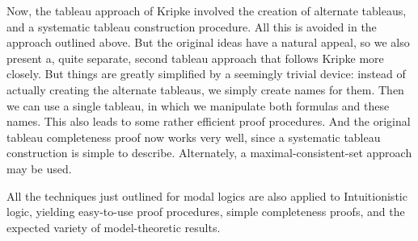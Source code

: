 Now, 
the tableau approach of Kripke involved the creation of alternate tableaus, 
and a systematic tableau construction procedure.
% 
All this is avoided in the approach outlined above.
% 
But the original ideas have a
natural appeal, 
so we also present a, 
quite separate,
second tableau approach that follows Kripke more closely.
% 
% 
But things are greatly simplified by a seemingly trivial device: 
instead of actually creating the alternate tableaus, 
we simply create names for them. 
% 
Then we can use a single tableau, 
in which we manipulate both formulas and these names. 
% 
This also leads to some rather efficient proof procedures.
% 
And the original tableau completeness proof now works very well, 
since a systematic tableau construction is simple to describe. 
% 
Alternately, a maximal-consistent-set approach may be used.




All the techniques just outlined for modal logics are also applied to Intuitionistic logic, 
yielding easy-to-use proof procedures, 
simple completeness proofs, 
and the expected variety of model-theoretic results.

